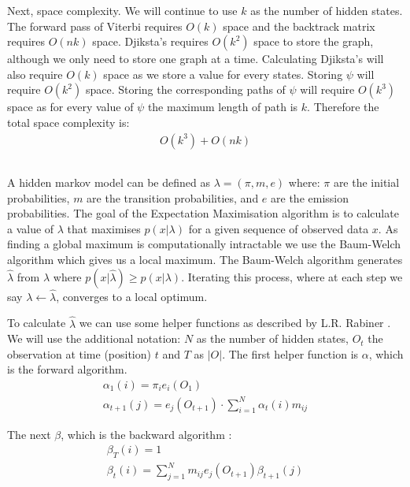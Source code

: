 Next, space complexity.
We will continue to use $k$ as the number of hidden states.
The forward pass of Viterbi requires $O(k)$ space and the backtrack matrix requires $O(nk)$ space.
Djiksta's requires $O(k^2)$ space to store the graph, although we only need to store one graph at a time.
Calculating Djiksta's will also require $O(k)$ space as we store a value for every states.
Storing $\psi$ will require $O(k^2)$ space.
Storing the corresponding paths of $\psi$ will require $O(k^3)$ space as for every value of $\psi$ the maximum length of path is $k$.
Therefore the total space complexity is:
\begin{align*}
    O(k^3) + O(nk)
\end{align*} 



\subsection{}
A hidden markov model can be defined as $\lambda = (\pi, m, e)$ where: $\pi$ are the initial probabilities, $m$ are the transition probabilities, and $e$ are the emission probabilities.
The goal of the Expectation Maximisation algorithm is to calculate a value of $\lambda$ that maximises $p(x|\lambda)$ for a given sequence of observed data $x$.
As finding a global maximum is computationally intractable we use the Baum-Welch algorithm which gives us a local maximum.
The Baum-Welch algorithm generates $\hat{\lambda}$ from $\lambda$ where $p(x|\hat{\lambda}) \geq p(x|\lambda)$.
Iterating this process, where at each step we say $\lambda \gets \hat{\lambda}$, converges to a local optimum.

To calculate $\hat{\lambda}$ we can use some helper functions as described by L.R. Rabiner \cite{em}.
We will use the additional notation: $N$ as the number of hidden states, $O_t$ the observation at time (position) $t$ and $T$ as $|O|$.
The first helper function is $\alpha$, which is the forward algorithm.
\begin{gather*}
    \alpha_1(i) = \pi_i e_i(O_1)\\
    \alpha_{t+1}(j) = e_j(O_{t+1}) \cdot \sum_{i=1}^N\alpha_t(i)m_{ij}
\end{gather*}

The next $\beta$, which is the backward algorithm :
\begin{gather*}
    \beta_T(i)=1\\
    \beta_t(i)=\sum_{j=1}^N m_{ij} e_j(O_{t+1}) \beta_{t+1}(j)
\end{gather*}

